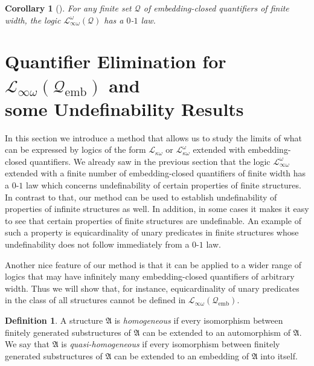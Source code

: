 \documentclass{ndjflart}
\theoremstyle{plain}
\newtheorem{corollary}[conjecture]{Corollary}
\theoremstyle{definition}
\newtheorem{definition}[conjecture]{Definition}
\numberwithin{equation}{section}
\DeclareMathOperator{\emb}{emb}
\begin{document}
\begin{corollary}[\cite{Dawar:2010}]
For any finite set $\mathcal{Q}$ of embedding-closed quantifiers of finite width,
the logic $\mathcal{L}^{\omega}_{\infty\omega}(\mathcal{Q})$ has a $0$-$1$ law.
\end{corollary}



\section{Quantifier Elimination for $\mathcal{L}_{\infty \omega}(\mathcal{Q}_{\emb})$ and \\ some Undefinability Results}\label{chain_section}

In this section we introduce a method that allows us to study the limits of what can be expressed by logics of the form $\mathcal{L}_{\kappa\omega}$ or $\mathcal{L}^{\omega}_{\kappa\omega}$ extended with embedding-closed quantifiers.
We already saw in the previous section that the logic $\mathcal{L}_{\infty\omega}^{\omega}$ extended with a finite number of embedding-closed quantifiers of finite width has a $0$-$1$ law
which concerns undefinability of certain properties of finite structures.
In contrast to that, our method can be used to establish undefinability of properties of infinite structures as well. In addition, in some cases it makes it easy to see that certain properties of finite structures are undefinable.
An example of such a property is equicardinality of unary predicates in finite structures whose undefinability does not follow immediately from a $0$-$1$ law.

Another nice feature of our method is that it can 
be applied to 
a wider range of logics that may have infinitely many embedding-closed quantifiers  
of arbitrary width. 
Thus we will show that, for instance, equicardinality of unary predicates in the class of all structures cannot be defined in $\mathcal{L}_{\infty \omega}(\mathcal{Q}_{\emb})$.

\begin{definition}
A structure $\mathfrak{A}$ is \emph{homogeneous} if every isomorphism between finitely generated substructures of $\mathfrak{A}$ can be extended to an automorphism of $\mathfrak{A}$. We say that $\mathfrak{A}$ is \emph{quasi-homogeneous} if every isomorphism between finitely generated substructures of $\mathfrak{A}$ can be extended to an embedding of $\mathfrak{A}$ into itself.
\end{definition}
\end{document}
